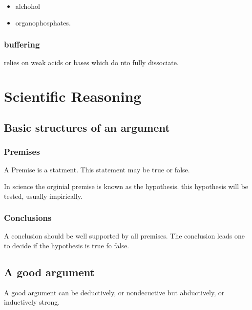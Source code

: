 \documentclass[]{article}
\providecommand{\tightlist}{%
  \setlength{\itemsep}{0pt}\setlength{\parskip}{0pt}}
\begin{document}
\begin{itemize}
\tightlist
\item
  alchohol
\item
  organophosphates.
\end{itemize}

\hypertarget{buffering}{%
\subsubsection{buffering}\label{buffering}}

relies on weak acids or bases which do nto fully dissociate.

\hypertarget{scientific-reasoning}{%
\section{Scientific Reasoning}\label{scientific-reasoning}}

\hypertarget{basic-structures-of-an-argument}{%
\subsection{Basic structures of an
argument}\label{basic-structures-of-an-argument}}

\hypertarget{premises}{%
\subsubsection{Premises}\label{premises}}

A Premise is a statment. This statement may be true or false.

In science the orginial premise is known as the hypothesis. this
hypothesis will be tested, usually impirically.

\hypertarget{conclusions}{%
\subsubsection{Conclusions}\label{conclusions}}

A conclusion should be well supported by all premises. The conclusion
leads one to decide if the hypothesis is true fo false.

\hypertarget{a-good-argument}{%
\subsection{A good argument}\label{a-good-argument}}

A good argument can be deductively, or nondecuctive but abductively, or
inductively strong.
\end{document}
